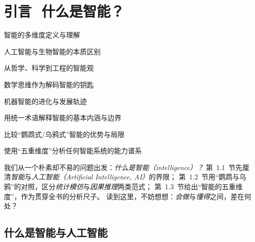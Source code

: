 \chapter{ 引言\,\,  什么是智能？}
 \begin{introduction}
  \item 智能的多维度定义与理解
  \item 人工智能与生物智能的本质区别
  \item 从哲学、科学到工程的智能观
  \item 数学思维作为解码智能的钥匙
  \item 机器智能的进化与发展轨迹
\end{introduction}

\begin{introduction}
  \item 用统一术语解释智能的基本内涵与边界
  \item 比较“鹦鹉式/乌鸦式”智能的优势与局限
  \item 使用“五重维度”分析任何智能系统的能力谱系
\end{introduction}


我们从一个朴素却不易的问题出发：\emph{什么是智能（intelligence）？}
第~1.1~节先厘清\emph{智能}与\emph{人工智能（Artificial Intelligence, AI）}的界限；
第~1.2~节用“鹦鹉与乌鸦”的对照，区分\emph{统计模仿}与\emph{因果推理}两类范式；
第~1.3~节给出“智能的五重维度”，作为贯穿全书的分析尺子。
读到这里，不妨想想：\emph{会做}与\emph{懂得}之间，差在何处？

\section{什么是智能与人工智能}


